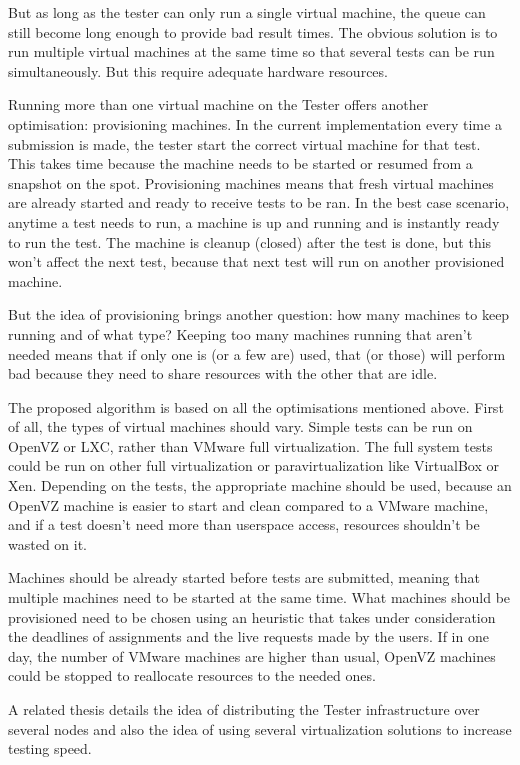 But as long as the tester can only run a single virtual machine, the queue
can still become long enough to provide bad result times. The obvious
solution is to run multiple virtual machines at the same time so that
several tests can be run simultaneously. But this require adequate hardware
resources.

Running more than one virtual machine on the Tester offers another
optimisation: provisioning machines. In the current implementation every
time a submission is made, the tester start the correct virtual machine for
that test. This takes time because the machine needs to be started or
resumed from a snapshot on the spot. Provisioning machines means that fresh
virtual machines are already started and ready to receive tests to be ran.
In the best case scenario, anytime a test needs to run, a machine is up and
running and is instantly ready to run the test. The machine is cleanup
(closed) after the test is done, but this won't affect the next test,
because that next test will run on another provisioned machine.

But the idea of provisioning brings another question: how many machines to
keep running and of what type? Keeping too many machines running that
aren't needed means that if only one is (or a few are) used, that (or
those) will perform bad because they need to share resources with the other
that are idle.

The proposed algorithm is based on all the optimisations mentioned above.
First of all, the types of virtual machines should vary. Simple tests can
be run on OpenVZ or LXC, rather than VMware full virtualization. The full
system tests could be run on other full virtualization or
paravirtualization like VirtualBox or Xen. Depending on the tests, the
appropriate machine should be used, because an OpenVZ machine is easier to
start and clean compared to a VMware machine, and if a test doesn't need
more than userspace access, resources shouldn't be wasted on it.

Machines should be already started before tests are submitted, meaning that
multiple machines need to be started at the same time. What machines should
be provisioned need to be chosen using an heuristic that takes under
consideration the deadlines of assignments and the live requests made by
the users. If in one day, the number of VMware machines are higher than
usual, OpenVZ machines could be stopped to reallocate resources to the
needed ones.

A related thesis \cite{paper:vmchecker} details the idea of distributing
the Tester infrastructure over several nodes and also the idea of using
several virtualization solutions to increase testing speed.



